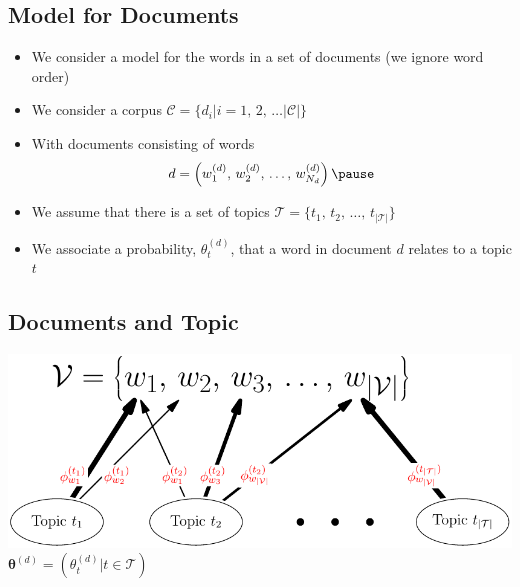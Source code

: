 \Outline %

\begin{slide}
\section{Model for Documents}

\begin{PauseHighLight}
  \begin{itemize}
  \item We consider a model for the words in a set of documents (we
    ignore word order)\pause
  \item We consider a corpus $\mathcal{C} = \{d_i | i = 1,\, 2,\, \ldots
    |\mathcal{C}|\}$\pause
  \item With documents consisting of words
    \begin{align*}
      d = \left(w_1^{(d)},\, w_2^{(d)},\, \ldots,\, w_{N_d}^{(d)}\right)\pause
    \end{align*}
  \item We assume that there is a set of topics
    $\mathcal{T}=\{t_1,\,t_2,\,\ldots,\, t_{|\mathcal{T}|}\}$\pause
  \item We associate a probability, $\theta^{(d)}_t$, that a
    word in document $d$ relates to a topic $t$\pause
  \end{itemize}
\end{PauseHighLight}

\end{slide}


\begin{slide}
\section[-1]{Documents and Topic}
\begin{center}
  \includegraphics[width=\linewidth]{topicModel}\pause\\
  $\bm{\theta}^{(d)} = (\theta^{(d)}_t | t \in \mathcal{T})$\pause
\end{center}
\end{slide}

